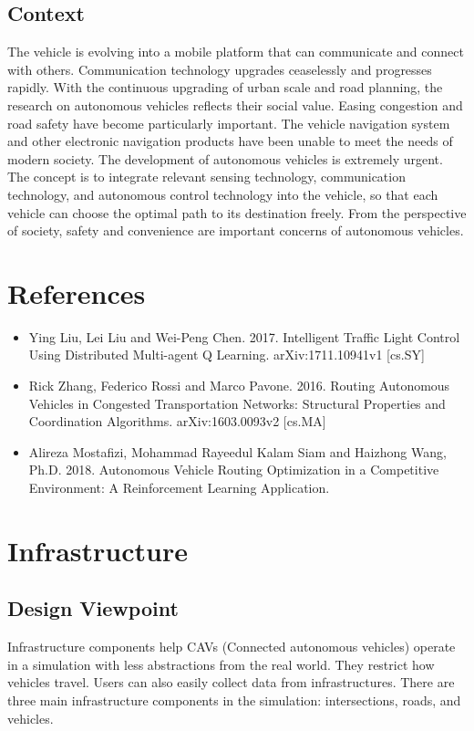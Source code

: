 \documentclass[onecolumn, draftclsnofoot,10pt, compsoc]{IEEEtran}
\begin{document}
\subsection{Context}
The vehicle is evolving into a mobile platform that can communicate and connect with others.
Communication technology upgrades ceaselessly and progresses rapidly.
With the continuous upgrading of urban scale and road planning, the research on autonomous vehicles reflects their social value.
Easing congestion and road safety have become particularly important.
The vehicle navigation system and other electronic navigation products have been unable to meet the needs of modern society.
The development of autonomous vehicles is extremely urgent.
The concept is to integrate relevant sensing technology, communication technology, and autonomous control technology into the vehicle, so that each vehicle can choose the optimal path to its destination freely.
From the perspective of society, safety and convenience are important concerns of autonomous vehicles.
\section{References}
\begin{itemize}
\item Ying Liu, Lei Liu and Wei-Peng Chen. 2017. Intelligent Traffic Light Control Using Distributed Multi-agent Q Learning. arXiv:1711.10941v1 [cs.SY]
\item Rick Zhang, Federico Rossi and Marco Pavone. 2016. Routing Autonomous Vehicles in Congested Transportation Networks: Structural Properties and Coordination Algorithms. arXiv:1603.0093v2 [cs.MA]
\item Alireza Mostafizi, Mohammad Rayeedul Kalam Siam and Haizhong Wang, Ph.D. 2018.  Autonomous Vehicle Routing Optimization in a Competitive Environment: A Reinforcement Learning Application.
\end{itemize}
\section{Infrastructure}
\subsection{Design Viewpoint}
Infrastructure components help CAVs (Connected autonomous vehicles) operate in a simulation with less abstractions from the real world.
They restrict how vehicles travel.
Users can also easily collect data from infrastructures.
There are three main infrastructure components in the simulation: intersections, roads, and vehicles.
\end{document}
